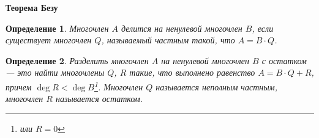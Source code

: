\documentclass{article}
\newtheorem{definition}{Определение}
\begin{document}
\large
	
	
	\begin{center}
		\textbf{Теорема Безу}
	\end{center}

\begin{definition}
	Многочлен $A$ {\it делится} на ненулевой многочлен $B$, если
	существует многочлен $Q$, называемый {\it частным} такой, что $A=B\cdot Q$.
\end{definition} 


\begin{definition}
	Разделить многочлен $A$ на ненулевой многочлен $B$ с 
	остатком --- это найти многочлены $Q$, $R$ такие, что выполнено равенство 
	$A=B\cdot Q+R$, причем $\deg R<\deg B$\footnote{ или $R=0$}. 
	Многочлен $Q$ называется {\it неполным частным}, многочлен $R$ называется {\it остатком}.
\end{definition} 
\end{document}

